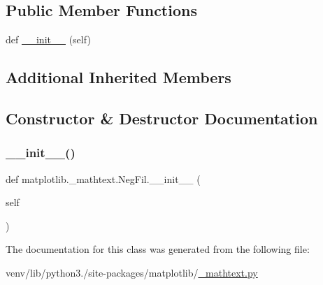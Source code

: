 \subsection*{Public Member Functions}
\begin{DoxyCompactItemize}
\item 
def \hyperlink{classmatplotlib_1_1__mathtext_1_1NegFil_a66f6357c7b44201b9f54094440065459}{\+\_\+\+\_\+init\+\_\+\+\_\+} (self)
\end{DoxyCompactItemize}
\subsection*{Additional Inherited Members}


\subsection{Constructor \& Destructor Documentation}
\mbox{\label{classmatplotlib_1_1__mathtext_1_1NegFil_a66f6357c7b44201b9f54094440065459}} 
\subsubsection{\texorpdfstring{\+\_\+\+\_\+init\+\_\+\+\_\+()}{\_\_init\_\_()}}
{\footnotesize\ttfamily def matplotlib.\+\_\+mathtext.\+Neg\+Fil.\+\_\+\+\_\+init\+\_\+\+\_\+ (\begin{DoxyParamCaption}\item[{}]{self }\end{DoxyParamCaption})}



The documentation for this class was generated from the following file\+:\begin{DoxyCompactItemize}
\item 
venv/lib/python3./site-\/packages/matplotlib/\hyperlink{__mathtext_8py}{\+\_\+mathtext.\+py}\end{DoxyCompactItemize}
